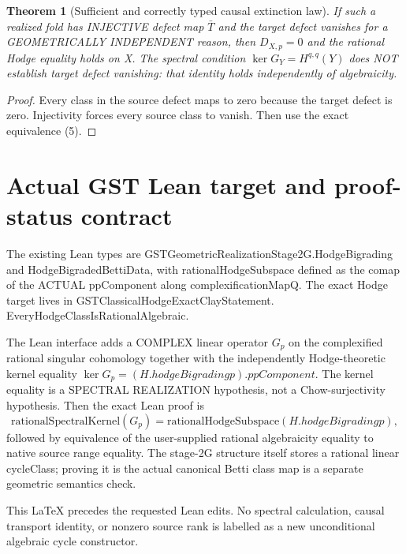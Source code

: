 \documentclass[11pt]{article}
\newtheorem{theorem}{Theorem}
\begin{document}
\begin{theorem}[Sufficient and correctly typed causal extinction law]
If such a realized fold has INJECTIVE defect map
\(\bar T\) and the target defect vanishes for a
GEOMETRICALLY INDEPENDENT reason, then
\(D_{X,p}=0\) and the rational Hodge equality holds on X.
The spectral condition \(\ker G_Y=H^{q,q}(Y)\)
does NOT establish target defect vanishing:
that identity holds independently of algebraicity.
\end{theorem}
\begin{proof}
Every class in the source defect maps to zero
because the target defect is zero.
Injectivity forces every source class to vanish.
Then use the exact equivalence (5).
\end{proof}

\section{Actual GST Lean target and proof-status contract}
The existing Lean types are
GSTGeometricRealizationStage2G.HodgeBigrading
and HodgeBigradedBettiData, with
rationalHodgeSubspace defined as the comap of
the ACTUAL ppComponent along complexificationMapQ.
The exact Hodge target lives in
GSTClassicalHodgeExactClayStatement.
EveryHodgeClassIsRationalAlgebraic.

The Lean interface adds a COMPLEX linear operator
\(G_p\) on the complexified rational singular
cohomology together with the independently
Hodge-theoretic kernel equality
\(\ker G_p=(H.hodgeBigrading p).ppComponent\).
The kernel equality is a SPECTRAL REALIZATION
hypothesis, not a Chow-surjectivity hypothesis.
Then the exact Lean proof is
\[
 \mathrm{rationalSpectralKernel}(G_p)
   =\mathrm{rationalHodgeSubspace}(H.hodgeBigrading p),
\]
followed by equivalence of the user-supplied
rational algebraicity equality to native source
range equality. The stage-2G structure itself
stores a rational linear cycleClass; proving it
is the actual canonical Betti class map is a
separate geometric semantics check.

This LaTeX precedes the requested Lean edits.
No spectral calculation, causal transport identity,
or nonzero source rank is labelled as a new
unconditional algebraic cycle constructor.
\end{document}
